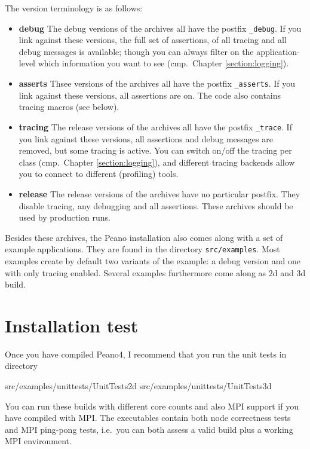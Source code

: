 The version terminology is as follows:
\begin{itemize}
  \item {\bf debug} The debug versions of the archives all have the postfix
  \texttt{\_debug}. If you link against these versions, the full set of
  assertions, of all tracing and all debug messages is available; though you can
  always filter on the application-level which information you want to see
  (cmp.~Chapter \ref{section:logging}).
  \item {\bf asserts} Thsee versions of the archives all have the postfix
  \texttt{\_asserts}. If you link against these versions, all assertions are on.
  The code also contains tracing macros (see below).
  \item {\bf tracing} The release versions of the archives all have the postfix
  \texttt{\_trace}. If you link against these versions, all assertions and debug
  messages are removed, but some tracing is active. You can switch on/off the
  tracing per class (cmp.~Chapter \ref{section:logging}), and different tracing
  backends allow you to connect to different (profiling) tools.
  \item {\bf release} The release versions of the archives have no
  particular postfix. They disable tracing, any debugging and all assertions.
  These archives should be used by production runs.
\end{itemize}


\noindent
Besides these archives, the Peano installation also comes along with a set of
example applications.
They are found in the directory \texttt{src/examples}.
Most examples create by default two variants of the example: a debug
version and one with only tracing enabled.
Several examples furthermore come along as 2d and 3d build.


\section{Installation test}

Once you have compiled Peano4, I recommend that you run the unit tests in
directory

\begin{code}
  src/examples/unittests/UnitTests2d
  src/examples/unittests/UnitTests3d
\end{code}

\noindent
You can run these builds with different core counts and also MPI support if you
have compiled with MPI.
The executables contain both node correctness tests and MPI ping-pong tests,
i.e.~you can both assess a valid build plus a working MPI environment.


